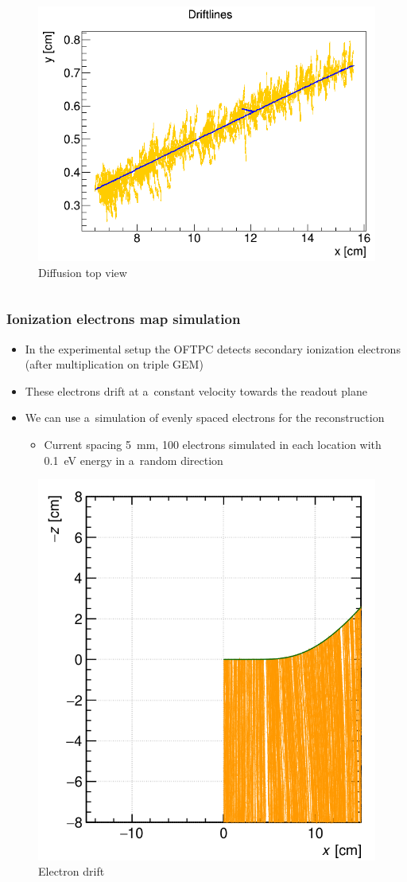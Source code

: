\documentclass{beamer}
\begin{document}
\begin{frame}
\begin{columns}
\begin{figure}
				\centering
				\includegraphics[width = 0.95 \linewidth]{../images/drift_xy.png}
				\caption{Diffusion top view}
			\end{figure}
		\end{columns}
	\end{frame}

	\begin{frame}
		\frametitle{Ionization electrons map simulation}
		\begin{itemize}
			\item In the experimental setup the OFTPC detects secondary ionization electrons (after multiplication on triple GEM)
			\item These electrons drift at a~constant velocity towards the readout plane
			\item We can use a~simulation of evenly spaced electrons for the reconstruction
			\begin{itemize}
				\item Current spacing 5~mm, 100 electrons simulated in each location with 0.1~eV energy in a~random direction
			\end{itemize}
		\end{itemize}
		\begin{figure}
			\centering
			\includegraphics[width = 0.3 \linewidth]{../images/track2.png}
			\caption{Electron drift}
		\end{figure}
	\end{frame}
\end{document}
